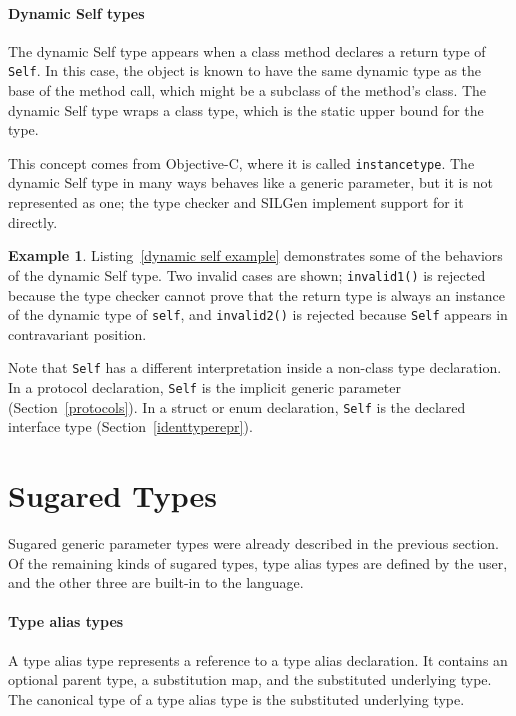 \documentclass[a4paper,headsepline,bibliography=totoc,toc=flat,fleqn,twoside=semi]{scrbook}
\theoremstyle{definition}
\theoremstyle{definition}
\newtheorem{example}{Example}[chapter]
\theoremstyle{definition}
\begin{document}
\paragraph{Dynamic Self types}
The dynamic Self type appears when a class method declares a return type of \texttt{Self}. In this case, the object is known to have the same dynamic type as the base of the method call, which might be a subclass of the method's class. The dynamic Self type wraps a class type, which is the static upper bound for the type.

This concept comes from Objective-C, where it is called \texttt{instancetype}. The dynamic Self type in many ways behaves like a generic parameter, but it is not represented as one; the type checker and SILGen implement support for it directly.
\begin{example} Listing~\ref{dynamic self example} demonstrates some of the behaviors of the dynamic Self type. Two invalid cases are shown; \texttt{invalid1()} is rejected because the type checker cannot prove that the return type is always an instance of the dynamic type of \texttt{self}, and \texttt{invalid2()} is rejected because \texttt{Self} appears in contravariant position.

Note that \texttt{Self} has a different interpretation inside a non-class type declaration. In a protocol declaration, \texttt{Self} is the implicit generic parameter (Section~\ref{protocols}). In a struct or enum declaration, \texttt{Self} is the declared interface type (Section~\ref{identtyperepr}).
\end{example}

\section{Sugared Types}\label{sugared types}

Sugared generic parameter types were already described in the previous section. Of the remaining kinds of sugared types, type alias types are defined by the user, and the other three are built-in to the language.

\paragraph{Type alias types} A type alias type represents a reference to a type alias declaration. It contains an optional parent type, a substitution map, and the substituted underlying type. The canonical type of a type alias type is the substituted underlying type.
\end{document}
